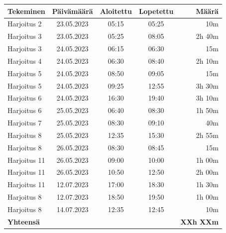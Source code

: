 \begin{table}[H]
  \centering
  \label{tab:other-studing-working-hours}
  \begin{tabular*}{\linewidth}{@{\extracolsep{\fill}} l c c c r }
    \textbf{Tekeminen} & \textbf{Päivämäärä} & \textbf{Aloitettu} & \textbf{Lopetettu} & \textbf{Määrä} \\
    \hline
    Harjoitus 2  & 23.05.2023 & 05:15 & 05:25 &    10m \\
    Harjoitus 3  & 23.05.2023 & 05:25 & 08:05 & 2h 40m \\
    Harjoitus 3  & 24.05.2023 & 06:15 & 06:30 &    15m \\
    Harjoitus 4  & 24.05.2023 & 06:30 & 08:40 & 2h 10m \\
    Harjoitus 5  & 24.05.2023 & 08:50 & 09:05 &    15m \\
    Harjoitus 5  & 24.05.2023 & 09:25 & 12:55 & 3h 30m \\
    Harjoitus 6  & 24.05.2023 & 16:30 & 19:40 & 3h 10m \\
    Harjoitus 6  & 25.05.2023 & 06:40 & 08:30 & 1h 50m \\
    Harjoitus 7  & 25.05.2023 & 08:30 & 09:10 &    40m \\
    Harjoitus 8  & 25.05.2023 & 12:35 & 15:30 & 2h 55m \\
    Harjoitus 8  & 26.05.2023 & 08:30 & 08:45 &    15m \\
    Harjoitus 11 & 26.05.2023 & 09:00 & 10:00 & 1h 00m \\
    Harjoitus 11 & 26.05.2023 & 10:50 & 12:50 & 2h 00m \\
    Harjoitus 11 & 12.07.2023 & 17:00 & 18:30 & 1h 30m \\
    Harjoitus  8 & 12.07.2023 & 18:50 & 19:50 & 1h 00m \\
    Harjoitus  8 & 14.07.2023 & 12:35 & 12:45 &    10m \\
    \hline
    \multicolumn{4}{l}{\textbf{Yhteensä}} & \textbf{XXh XXm} \\
  \end{tabular*}
\end{table}
